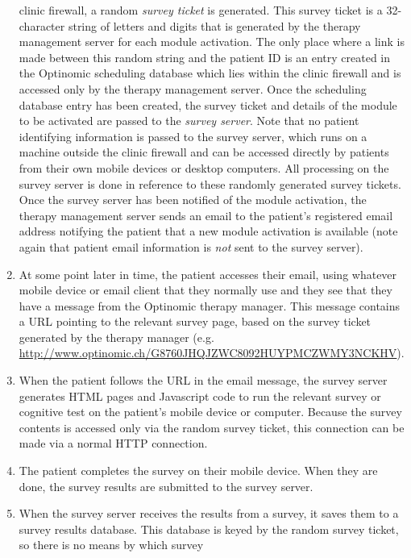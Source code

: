\documentclass[DIV=calc,paper=a4,fontsize=11pt,twocolumn]{scrartcl}
\begin{document}
\begin{enumerate}
{    clinic firewall, a random \emph{survey ticket} is generated.  This
    survey ticket is a 32-character string of letters and digits that
    is generated by the therapy management server for each module
    activation.  The only place where a link is made between this
    random string and the patient ID is an entry created in the
    Optinomic scheduling database which lies within the clinic
    firewall and is accessed only by the therapy management server.
    Once the scheduling database entry has been created, the survey
    ticket and details of the module to be activated are passed to the
    \emph{survey server}.  Note that no patient identifying
    information is passed to the survey server, which runs on a
    machine outside the clinic firewall and can be accessed directly
    by patients from their own mobile devices or desktop computers.
    All processing on the survey server is done in reference to these
    randomly generated survey tickets.  Once the survey server has
    been notified of the module activation, the therapy management
    server sends an email to the patient's registered email address
    notifying the patient that a new module activation is available
    (note again that patient email information is \emph{not} sent to
    the survey server).}
  \item{At some point later in time, the patient accesses their email,
    using whatever mobile device or email client that they normally
    use and they see that they have a message from the Optinomic
    therapy manager.  This message contains a URL pointing to the
    relevant survey page, based on the survey ticket generated by the
    therapy manager
    (e.g. \url{http://www.optinomic.ch/G8760JHQJZWC8092HUYPMCZWMY3NCKHV}).}
  \item{When the patient follows the URL in the email message, the
    survey server generates HTML pages and Javascript code to run the
    relevant survey or cognitive test on the patient's mobile device
    or computer.  Because the survey contents is accessed only via the
    random survey ticket, this connection can be made via a normal
    HTTP connection.}
  \item{The patient completes the survey on their mobile device.  When
    they are done, the survey results are submitted to the survey
    server.}
  \item{When the survey server receives the results from a survey, it
    saves them to a survey results database.  This database is keyed
    by the random survey ticket, so there is no means by which survey
}
\end{enumerate}
\end{document}
